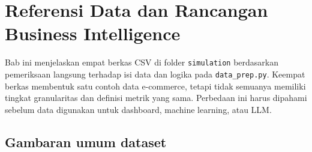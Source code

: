 \documentclass[
  indonesian,
  letterpaper,
  DIV=11,
  numbers=noendperiod]{scrreprt}
\begin{document}

\chapter*{Referensi Data dan Rancangan Business
Intelligence}\label{referensi-data-dan-rancangan-business-intelligence}


Bab ini menjelaskan empat berkas CSV di folder \texttt{simulation}
berdasarkan pemeriksaan langsung terhadap isi data dan logika pada
\texttt{data\_prep.py}. Keempat berkas membentuk satu contoh data
e-commerce, tetapi tidak semuanya memiliki tingkat granularitas dan
definisi metrik yang sama. Perbedaan ini harus dipahami sebelum data
digunakan untuk dashboard, machine learning, atau LLM.

\section*{Gambaran umum dataset}\label{gambaran-umum-dataset}

\end{document}
